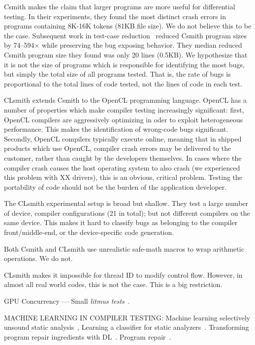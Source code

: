 Csmith makes the claim that larger programs are more useful for differential testing. In their experiments, they found the most distinct crash errors in programs containing 8K-16K tokens (81KB file size). We do not believe this to be the case. Subsequent work in test-case reduction~\cite{Regehr2012a} reduced Csmith program sizes by 74--594$\times$ while preserving the bug exposing behavior. They median reduced Csmith program size they found was only 20 lines (0.5KB). We hypothesize that it is not the size of programs which is responsible for identifying the most bugs, but simply the total size of all programs tested. That is, the rate of bugs is proportional to the total lines of code tested, not the lines of code in each test.

CLsmith extends Csmith to the OpenCL programming language. OpenCL has a number of properties which make compiler testing increasingly significant: first, OpenCL compilers are aggressively optimizing in oder to exploit heterogeneous performance. This makes the identification of wrong-code bugs significant. Secondly, OpenCL compilers typically execute online, meaning that in shipped products which use OpenCL, compiler crash errors may be delivered to the customer, rather than caught by the developers themselves. In cases where the compiler crash causes the host operating system to also crash (we experienced this problem with XX drivers), this is an obvious, critical problem. Testing the portability of code should not be the burden of the application developer.

The CLsmith experimental setup is broad but shallow. They test a large number of device, compiler configurations (21 in total); but not different compilers on the same device. This makes it hard to classify bugs as belonging to the compiler front/middle-end, or the device-specific code generation.

Both Csmith and CLsmith use unrealistic safe-math macros to wrap arithmetic operations. We do not.

CLsmith makes it impossible for thread ID to modify control flow. However, in almost all real world codes, this is not the case. This is a big restriction.

GPU Concurrency --- Small \emph{litmus tests}~\cite{Alglave2015}.

MACHINE LEARNING IN COMPILER TESTING: Machine learning selectively unsound static analysis~\cite{Heo2017}, Learning a classifier for static analyzers~\cite{Koc2017}.
Transforming program repair ingredients with DL~\cite{White}. Program repair~\cite{Koukoutos2017a}.

